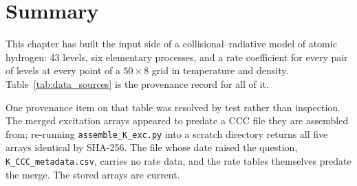 \section{Summary}
\label{sec:atoms_summary}

This chapter has built the input side of a collisional--radiative model of
atomic hydrogen: 43 levels, six elementary processes, and a rate coefficient for
every pair of levels at every point of a $50\times8$ grid in temperature and
density. Table~\ref{tab:data_sources} is the provenance record for all of it.

One provenance item on that table was resolved by test rather than inspection.
The merged excitation arrays appeared to predate a CCC file they are assembled
from; re-running \texttt{assemble\_K\_exc.py} into a scratch directory returns
all five arrays identical by SHA-256. The file whose date raised the question,
\texttt{K\_CCC\_metadata.csv}, carries no rate data, and the rate tables
themselves predate the merge. The stored arrays are current.

